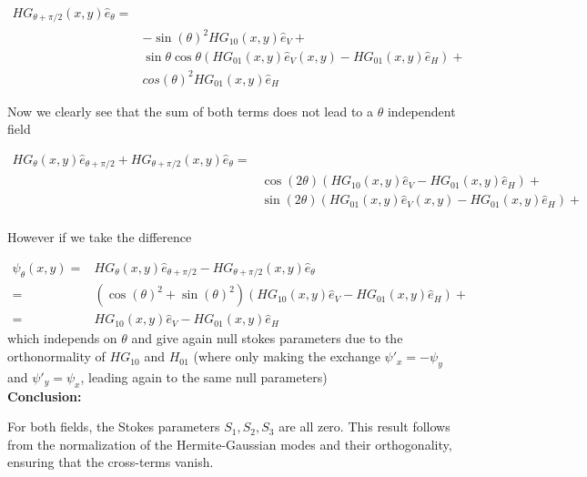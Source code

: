 \documentclass[12pt]{article}
\begin{document}
\begin{flushleft}
     \begin{align*}
         HG_{\theta+\pi/2}(x,y)\hat{e}_{\theta}=&\\
        &-\sin(\theta)^2HG_{10}(x,y)\hat{e}_{V}+\\
        &\sin{\theta}\cos{\theta}(HG_{01}(x,y)\hat{e}_{V}(x,y)-HG_{01}(x,y)\hat{e}_{H})+\\
        &cos(\theta)^2HG_{01}(x,y)\hat{e}_{H}
    \end{align*}

Now we clearly see that the sum of both terms does not lead to a $\theta $ independent field 

\begin{align*}
     HG_{\theta}(x,y)\hat{e}_{\theta+\pi/2}+HG_{\theta+\pi/2}(x,y)\hat{e}_{\theta}=&\\
        &\cos(2\theta)(HG_{10}(x,y)\hat{e}_{V}-HG_{01}(x,y)\hat{e}_{H})+\\
        &\sin(2\theta)(HG_{01}(x,y)\hat{e}_{V}(x,y)-HG_{01}(x,y)\hat{e}_{H})+\\
        &
    \end{align*}

However if we take the difference 

\begin{align*}
     \psi_\theta(x,y)=&HG_{\theta}(x,y)\hat{e}_{\theta+\pi/2}-HG_{\theta+\pi/2}(x,y)\hat{e}_{\theta}\\
        =&(\cos(\theta)^2+\sin(\theta)^2)(HG_{10}(x,y)\hat{e}_{V}-HG_{01}(x,y)\hat{e}_{H})+\\
        =&HG_{10}(x,y)\hat{e}_{V}-HG_{01}(x,y)\hat{e}_{H}
    \end{align*}
which independs on $\theta$ and give again null stokes parameters due to the orthonormality of $HG_{10}$ and $H_{01}$ (where only making the exchange $\psi'_x= -\psi_y$ and $\psi'_y = \psi_x$, leading again to the same null parameters)\\

\textbf{Conclusion:}

For both fields, the Stokes parameters \( S_1, S_2, S_3 \) are all zero. This result follows from the normalization of the Hermite-Gaussian modes and their orthogonality, ensuring that the cross-terms vanish.

\end{flushleft}
\end{document}
